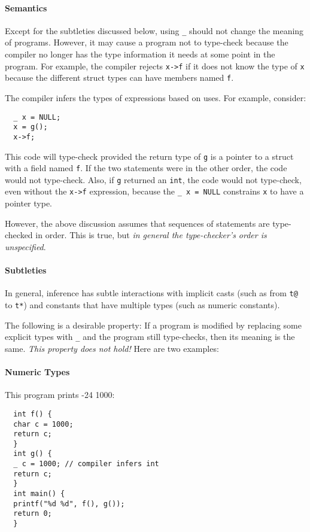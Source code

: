 \paragraph{Semantics}
Except for the subtleties discussed below, using \texttt{_} should not change the
meaning of programs.  However, it may cause a program not to type-check
because the compiler no longer has the type information it needs at some point
in the program.  For example, the compiler rejects \texttt{x->f} if it does not
know the type of \texttt{x} because the different struct types can have
members named \texttt{f}. 

The compiler infers the types of expressions based on uses.  For
example, consider:
\begin{verbatim}
  _ x = NULL;
  x = g();
  x->f;
\end{verbatim}
This code will type-check provided the return type of \texttt{g} is a
pointer to a struct with a field named \texttt{f}.  If the two
statements were in the other order, the code would not type-check. 
Also, if \texttt{g} returned an \texttt{int}, the code would not
type-check, even without the \texttt{x->f} expression, because the
\texttt{_ x = NULL} constrains \texttt{x} to have a pointer type.

However, the above discussion assumes that sequences of statements are
type-checked in order.  This is true, but \emph{in general the
  type-checker's order is unspecified}.

\paragraph{Subtleties}
In general, inference has subtle interactions with implicit casts
(such as from \texttt{t@} to \texttt{t*}) and constants that have multiple
types (such as numeric constants).

The following is a desirable property: If a program is modified by
replacing some explicit types with \texttt{_} and the program still
type-checks, then its meaning is the same.  \emph{This property does
  not hold!}  Here are two examples:

\paragraph{Numeric Types} This program prints -24 1000:
\begin{verbatim}
  int f() {
  char c = 1000;
  return c;
  }
  int g() {
  _ c = 1000; // compiler infers int
  return c;
  }
  int main() {
  printf("%d %d", f(), g());
  return 0;
  }
\end{verbatim}

